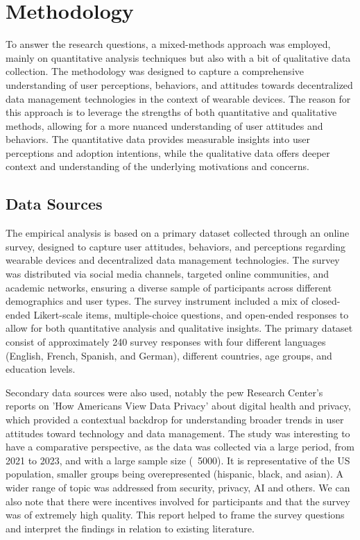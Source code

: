 \section{Methodology}

To answer the research questions, a mixed-methods approach was employed, mainly on quantitative analysis techniques but also with a bit of qualitative data collection. The methodology was designed to capture a comprehensive understanding of user perceptions, behaviors, and attitudes towards decentralized data management technologies in the context of wearable devices.
The reason for this approach is to leverage the strengths of both quantitative and qualitative methods, allowing for a more nuanced understanding of user attitudes and behaviors. The quantitative data provides measurable insights into user perceptions and adoption intentions, while the qualitative data offers deeper context and understanding of the underlying motivations and concerns.

\subsection{Data Sources}

The empirical analysis is based on a primary dataset collected through an online survey, designed to capture user attitudes, behaviors, and perceptions regarding wearable devices and decentralized data management technologies. The survey was distributed via social media channels, targeted online communities, and academic networks, ensuring a diverse sample of participants across different demographics and user types. The survey instrument included a mix of closed-ended Likert-scale items, multiple-choice questions, and open-ended responses to allow for both quantitative analysis and qualitative insights.
The primary dataset consist of approximately 240 survey responses with four different languages (English, French, Spanish, and German), different countries, age groups, and education levels. 

Secondary data sources were also used, notably the pew Research Center’s reports on 'How Americans View Data Privacy' about digital health and privacy, which provided a contextual backdrop for understanding broader trends in user attitudes toward technology and data management. The study was interesting to have a comparative perspective, as the data was collected via a large period, from 2021 to 2023, and with a large sample size (~5000). It is representative of the US population, smaller groups being overepresented (hispanic, black, and asian). A wider range of topic was addressed from security, privacy, AI and others. We can also note that there were incentives involved for participants and that the survey was of extremely high quality. This report helped to frame the survey questions and interpret the findings in relation to existing literature.
